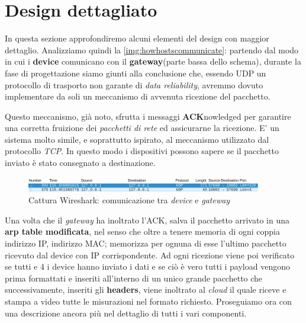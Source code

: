 \documentclass[a4paper,12pt]{report}
\begin{document}
\section{Design dettagliato}

In questa sezione approfondiremo alcuni elementi del design con maggior dettaglio.
Analizziamo quindi la \cref{img:howhostscommunicate}: partendo dal modo in cui i \textbf{device} comunicano con il \textbf{gateway}(parte bassa dello schema), durante la fase di progettazione siamo giunti alla conclusione che, essendo UDP un protocollo di trasporto non garante di \emph{data reliability}, avremmo dovuto implementare da soli un meccanismo di avvenuta ricezione del pacchetto.

Questo meccanismo, già noto, sfrutta i messaggi \textbf{ACK}nowledged per garantire una corretta fruizione dei \emph{pacchetti di rete} ed assicurarne la ricezione.
E' un sistema molto simile, e soprattutto ispirato, al meccanismo utilizzato dal protocollo \emph{TCP}.
%
In questo modo i dispositivi possono sapere se il pacchetto inviato è stato consegnato a destinazione.

\begin{figure}[H]
\centering{}
\includegraphics[width=\textwidth,height=25]{img/dev1_send.png}
\caption{Cattura Wireshark: comunicazione tra \emph{device} e \emph{gateway}}
\label{img:devsend}
\end{figure}
Una volta che il \emph{gateway} ha inoltrato l'ACK, salva il pacchetto arrivato in una \textbf{arp table modificata}, nel senso che oltre a tenere memoria di ogni coppia indirizzo IP, indirizzo MAC; memorizza per ognuna di esse l'ultimo pacchetto ricevuto dal device con IP corrispondente.
%
Ad ogni ricezione viene poi verificato se tutti e 4 i device hanno inviato i dati e se ciò è vero tutti i payload vengono prima formattati e inseriti all'interno di un unico grande pacchetto che successivamente, inseriti gli \textbf{headers}, viene inoltrato al \emph{cloud} il quale riceve e stampa a video tutte le misurazioni nel formato richiesto. Proseguiamo ora con una descrizione ancora più nel dettaglio di tutti i vari componenti.
\end{document}
